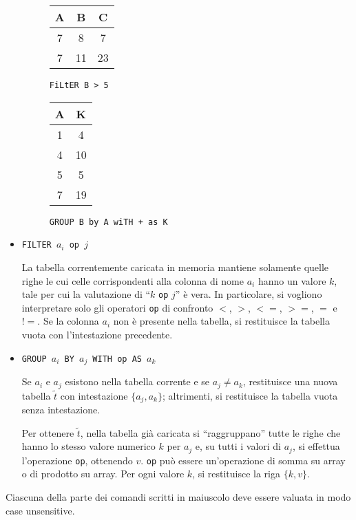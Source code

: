 \documentclass[]{scrartcl}
\begin{document}
\begin{itemize}
\begin{figure}[!t]
	\centering
	\begin{minipage}{.3\textwidth}
		\centering
\begin{tabular}{ccc}
	\toprule
	A &B&C\\
	\midrule
	7&8&7\\
	7&11&23\\
	\bottomrule
\end{tabular}
		\caption{\texttt{FiLtER B > 5}}
		\label{fig:c}
	\end{minipage}%
	\begin{minipage}{0.5\textwidth}
		\centering
		\begin{tabular}{cc}
			\toprule
			A &K\\
			\midrule
			1&4\\
			4&10\\
			5&5\\
			7&19\\
			\bottomrule
		\end{tabular}
		\caption{\texttt{GROUP B by A wiTH + as K}}
		\label{fig:d}
	\end{minipage}
\end{figure}
	\item \texttt{FILTER $a_i$ op $j$}
	
	La tabella correntemente caricata in memoria mantiene solamente quelle righe le cui celle corrispondenti alla colonna di nome $a_i$ hanno un valore $k$, tale per cui la valutazione di ``$k$ \texttt{op} $j$'' è vera. In particolare, si vogliono interpretare solo gli operatori \texttt{op} di confronto $<$, $>$, $<=$, $>=$, $=$ e $!=$. Se la colonna $a_i$ non è presente nella tabella, si restituisce la tabella vuota con l'intestazione precedente.
	
	\item \texttt{GROUP $a_i$ BY $a_j$ WITH op AS $a_k$}
	
	Se $a_i$ e $a_j$ esistono nella tabella corrente e se $a_j\neq a_k$, restituisce una nuova tabella $\tilde{t}$ con intestazione $\{a_j,a_k\}$; altrimenti, si restituisce la tabella vuota senza intestazione. 
	
	Per ottenere $\tilde{t}$, nella tabella già caricata si ``raggruppano'' tutte le righe che hanno lo stesso valore numerico $k$ per $a_j$ e, su tutti i valori di $a_j$, si effettua l'operazione \texttt{op}, ottenendo $v$. 	\texttt{op} può essere un'operazione di somma su array o di prodotto su array. Per ogni valore $k$, si restituisce la riga $\{k,v\}$.
\end{itemize}
Ciascuna della parte dei comandi scritti in maiuscolo deve essere valuata in modo case unsensitive.
\end{document}
